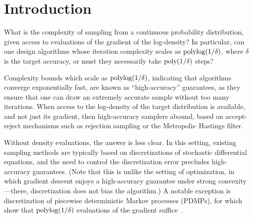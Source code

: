 \documentclass{article} %
\begin{document}
\begin{abstract}
We present algorithms for diffusion model sampling which obtain $\delta$-error in $\mathrm{polylog}(1/\delta)$ steps, given access to $\widetilde O(\delta)$-accurate score estimates in $L^2$. This is an exponential improvement over all previous results. Specifically, under minimal data assumptions, the complexity is $\widetilde O(d\,\mathrm{polylog}(1/\delta))$ where $d$ is the dimension of the data; under a non-uniform $L$-Lipschitz condition, the complexity is $\widetilde O(\sqrt{dL}\,\mathrm{polylog}(1/\delta))$; and if the data distribution has intrinsic dimension $d_\star$, then the complexity reduces to $\widetilde O(d_\star\,\mathrm{polylog}(1/\delta))$. Our approach also yields the first $\mathrm{polylog}(1/\delta)$ complexity sampler for general log-concave distributions using only gradient evaluations.
\end{abstract}


\section{Introduction}


What is the complexity of sampling from a continuous probability distribution, given access to evaluations of the gradient of the log-density?
In particular, can one design algorithms whose iteration complexity scales as $\mathrm{polylog}(1/\delta)$, where $\delta$ is the target accuracy, or must they necessarily take $\mathrm{poly}(1/\delta)$ steps?

Complexity bounds which scale as $\mathrm{polylog}(1/\delta)$, indicating that algorithms converge exponentially fast, are known as ``high-accuracy'' guarantees, as they ensure that one can draw an extremely accurate sample without too many iterations.
When access to the log-density of the target distribution is available, and not just its gradient, then high-accuracy samplers abound, based on accept-reject mechanisms such as rejection sampling or the Metropolis--Hastings filter.

Without density evaluations, the answer is less clear.
In this setting, existing sampling methods are typically based on discretizations of stochastic differential equations, and the need to control the discretization error precludes high-accuracy guarantees.
(Note that this is unlike the setting of optimization, in which gradient descent enjoys a high-accuracy guarantee under strong convexity---there, discretization does not bias the algorithm.)
A notable exception is discretization of piecewise deterministic Markov processes (PDMPs), for which~\citet{LuWan22Zigzag} show that $\mathrm{polylog}(1/\delta)$ evaluations of the gradient suffice~.
\end{document}
